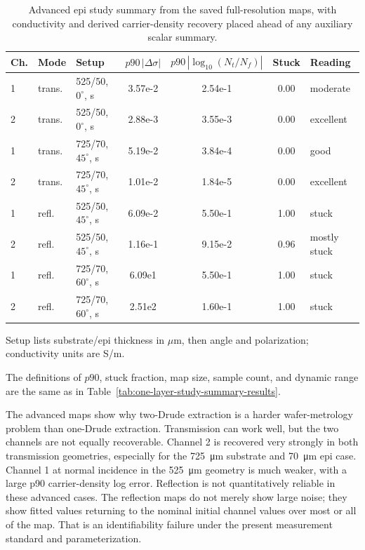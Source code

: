 \documentclass[11pt]{article}
\begin{document}
\begin{table}[htbp]
\centering
\begin{threeparttable}
\caption{Advanced epi study summary from the saved full-resolution maps, with conductivity and derived carrier-density recovery placed ahead of any auxiliary scalar summary.}
\label{tab:advanced-study-summary-results}
\scriptsize
\begin{tabularx}{\linewidth}{@{}p{1.0cm}p{1.1cm}p{2.0cm}S[table-format=2.2e1]S[table-format=1.2e1]S[table-format=1.2]Y@{}}
\toprule
Ch. & Mode & Setup & {$p90\,|\Delta\sigma|$} & {$p90\,|\log_{10}(N_t/N_f)|$} & {Stuck} & Reading \\
 & trans. & 525/50, \(0^\circ\), s & 3.57e-2 & 2.54e-1 & 0.00 & moderate \\
2 & trans. & 525/50, \(0^\circ\), s & 2.88e-3 & 3.55e-3 & 0.00 & excellent \\
1 & trans. & 725/70, \(45^\circ\), s & 5.19e-2 & 3.84e-4 & 0.00 & good \\
2 & trans. & 725/70, \(45^\circ\), s & 1.01e-2 & 1.84e-5 & 0.00 & excellent \\
1 & refl. & 525/50, \(45^\circ\), s & 6.09e-2 & 5.50e-1 & 1.00 & stuck \\
2 & refl. & 525/50, \(45^\circ\), s & 1.16e-1 & 9.15e-2 & 0.96 & mostly stuck \\
1 & refl. & 725/70, \(60^\circ\), s & 6.09e1 & 5.50e-1 & 1.00 & stuck \\
2 & refl. & 725/70, \(60^\circ\), s & 2.51e2 & 1.60e-1 & 1.00 & stuck \\
\bottomrule
\end{tabularx}
\begin{tablenotes}[flushleft]
\footnotesize
\item Setup lists substrate/epi thickness in \(\mu\)m, then angle and polarization; conductivity units are S/m.
\item The definitions of \(p90\), stuck fraction, map size, sample count, and dynamic range are the same as in Table~\ref{tab:one-layer-study-summary-results}.
\end{tablenotes}
\end{threeparttable}
\end{table}

The advanced maps show why two-Drude extraction is a harder wafer-metrology problem than one-Drude extraction. Transmission can work well, but the two channels are not equally recoverable. Channel 2 is recovered very strongly in both transmission geometries, especially for the \SI{725}{\micro\meter} substrate and \SI{70}{\micro\meter} epi case. Channel 1 at normal incidence in the \SI{525}{\micro\meter} geometry is much weaker, with a large p90 carrier-density log error. Reflection is not quantitatively reliable in these advanced cases. The reflection maps do not merely show large noise; they show fitted values returning to the nominal initial channel values over most or all of the map. That is an identifiability failure under the present measurement standard and parameterization.
\end{document}
